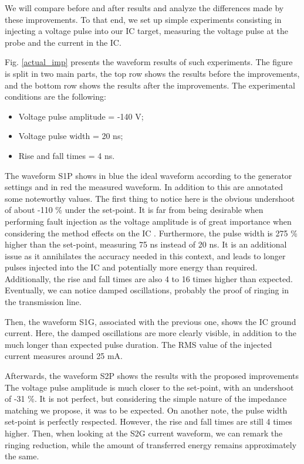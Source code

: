 		We will compare before and after results and analyze the differences made by these improvements.
		To that end, we set up simple experiments consisting in injecting a voltage pulse into our IC target, measuring the voltage pulse at the probe and the current in the IC.
		
		Fig. \ref{actual_imp} presents the waveform results of such experiments.
		The figure is split in two main parts, the top row shows the results before the improvements, and the bottom row shows the results after the improvements.
		The experimental conditions are the following:
		\begin{itemize}
			\item Voltage pulse amplitude = -140 V;
			\item Voltage pulse width = 20 ns;
			\item Rise and fall times = 4 ns.
		\end{itemize}

		The waveform S1P shows in blue the ideal waveform according to the generator settings and in red the measured waveform.
		In addition to this are annotated some noteworthy values.
		The first thing to notice here is the obvious undershoot of about -110 \% under the set-point.
		It is far from being desirable when performing fault injection as the voltage amplitude is of great importance when considering the method effects on the IC \cite{mybbifdtc2023}.
		Furthermore, the pulse width is 275 \% higher than the set-point, measuring 75 ns instead of 20 ns.
		It is an additional issue as it annihilates the accuracy needed in this context, and leads to longer pulses injected into the IC and potentially more energy than required.
		Additionally, the rise and fall times are also 4 to 16 times higher than expected.
		Eventually, we can notice damped oscillations, probably the proof of ringing in the transmission line.

		Then, the waveform S1G, associated with the previous one, shows the IC ground current.
		Here, the damped oscillations are more clearly visible, in addition to the much longer than expected pulse duration.
		The RMS value of the injected current measures around 25 mA.

		Afterwards, the waveform S2P shows the results with the proposed improvements
		The voltage pulse amplitude is much closer to the set-point, with an undershoot of -31 \%.
		It is not perfect, but considering the simple nature of the impedance matching we propose, it was to be expected.
		On another note, the pulse width set-point is perfectly respected.
		However, the rise and fall times are still 4 times higher.
		Then, when looking at the S2G current waveform, we can remark the ringing reduction, while the amount of transferred energy remains approximately the same.

